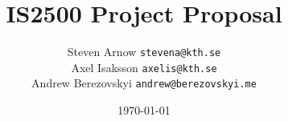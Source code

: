 \documentclass[a4paper,12pt]{article}
\begin{document}
\setcounter{page}{0}

\pagestyle{myheadings}

\title{IS2500 Project Proposal}
\author{Steven Arnow \texttt{stevena@kth.se} \\
Axel Isaksson \texttt{axelis@kth.se} \\
Andrew Berezovskyi \texttt{andrew@berezovskyi.me}}
\date{\today}
\maketitle

\thispagestyle{empty}
\newpage




\end{document}
